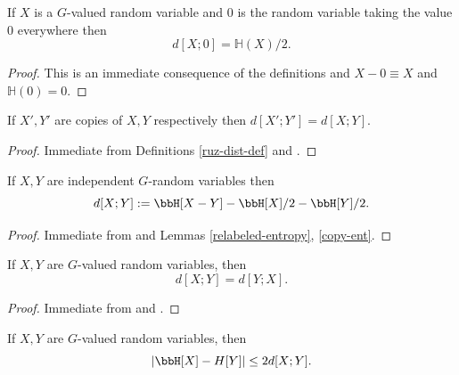 \begin{lemma}\label{dist-zero}
  \leanok
If $X$ is a $G$-valued random variable and $0$ is the random variable taking the value $0$ everywhere then
\[d[X;0]=\mathbb{H}(X)/2.\]
\end{lemma}

\begin{proof}\leanok
This is an immediate consequence of the definitions and $X-0\equiv X$ and $\mathbb{H}(0)=0$.
\end{proof}

\begin{lemma}\label{ruz-copy}
  \leanok
  If $X',Y'$ are copies of $X,Y$ respectively then $d[X';Y']=d[X ;Y]$.
\end{lemma}

\begin{proof} \leanok Immediate from Definitions \ref{ruz-dist-def} and .
\end{proof}

\begin{lemma}\label{ruz-indep}
  \leanok
  If $X,Y$ are independent $G$-random variables then
  $$ d[X ;Y] := \bbH[X - Y] - \bbH[X]/2 - \bbH[Y]/2.$$
\end{lemma}

\begin{proof} \leanok Immediate from  and Lemmas \ref{relabeled-entropy}, \ref{copy-ent}.
\end{proof}

\begin{lemma}\label{ruzsa-symm}
  \leanok
  If $X,Y$ are $G$-valued random variables, then
  $$ d[X ;Y] = d[Y;X].$$
\end{lemma}

\begin{proof} \leanok Immediate from  and .
\end{proof}

\begin{lemma}\label{ruzsa-diff}
  \leanok
  If $X,Y$ are $G$-valued random variables, then
$$|\bbH[X]-H[Y]| \leq 2 d[X ;Y].$$
\end{lemma}

